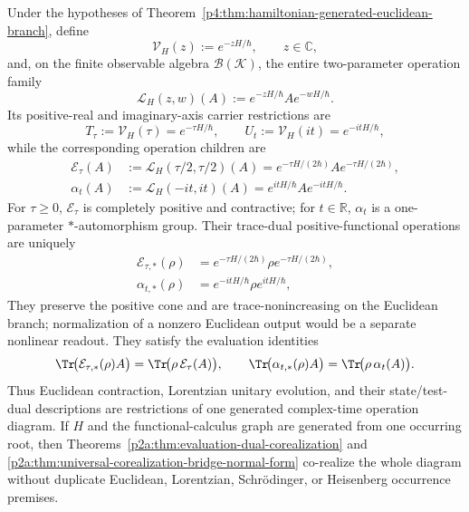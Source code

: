 \documentclass[12pt,a4paper]{article}
\begin{document}
\begin{theorem}
\label{p4:thm:complex-time-reciprocal-dynamics-square}
Under the hypotheses of
Theorem~\ref{p4:thm:hamiltonian-generated-euclidean-branch}, define
\begin{equation}
\label{p4:eq:complex-time-carrier-parent}
 \mathcal V_H(z):=e^{-zH/\hbar},
 \qquad z\in\mathbb C,
\end{equation}
and, on the finite observable algebra \(\mathcal B(\mathcal K)\), the entire
two-parameter operation family
\begin{equation}
\label{p4:eq:complex-time-two-sided-parent}
 \mathcal L_H(z,w)(A)
 :=e^{-zH/\hbar}A e^{-wH/\hbar}.
\end{equation}
Its positive-real and imaginary-axis carrier restrictions are
\begin{equation}
\label{p4:eq:complex-time-carrier-children}
 T_\tau:=\mathcal V_H(\tau)=e^{-\tau H/\hbar},
 \qquad
 U_t:=\mathcal V_H(it)=e^{-itH/\hbar},
\end{equation}
while the corresponding operation children are
\begin{align}
\label{p4:eq:complex-time-operation-children}
 \mathcal E_\tau(A)
 &:=\mathcal L_H(\tau/2,\tau/2)(A)
   =e^{-\tau H/(2\hbar)}A e^{-\tau H/(2\hbar)},\\
 \alpha_t(A)
 &:=\mathcal L_H(-it,it)(A)
   =e^{itH/\hbar}A e^{-itH/\hbar}.
\end{align}
For \(\tau\ge0\), \(\mathcal E_\tau\) is completely positive and
contractive; for \(t\in\mathbb R\), \(\alpha_t\) is a one-parameter
\(*\)-automorphism group.  Their trace-dual positive-functional operations are uniquely
\begin{align}
\label{p4:eq:complex-time-state-children}
 \mathcal E_{\tau,*}(\rho)
 &=e^{-\tau H/(2\hbar)}\rho e^{-\tau H/(2\hbar)},\\
 \alpha_{t,*}(\rho)
 &=e^{-itH/\hbar}\rho e^{itH/\hbar},
\end{align}
They preserve the positive cone and are trace-nonincreasing on the Euclidean
branch; normalization of a nonzero Euclidean output would be a separate
nonlinear readout.  They satisfy the evaluation identities
\begin{equation}
\label{p4:eq:complex-time-evaluation-square}
 \Tr\!\bigl(\mathcal E_{\tau,*}(\rho)A\bigr)
 =\Tr\!\bigl(\rho\,\mathcal E_\tau(A)\bigr),
 \qquad
 \Tr\!\bigl(\alpha_{t,*}(\rho)A\bigr)
 =\Tr\!\bigl(\rho\,\alpha_t(A)\bigr).
\end{equation}
Thus Euclidean contraction, Lorentzian unitary evolution, and their
state/test-dual descriptions are restrictions of one generated complex-time
operation diagram.  If \(H\) and the functional-calculus graph are generated
from one occurring root, then
Theorems~\ref{p2a:thm:evaluation-dual-corealization} and
\ref{p2a:thm:universal-corealization-bridge-normal-form} co-realize the whole
diagram without duplicate Euclidean, Lorentzian, Schr\"odinger, or Heisenberg
occurrence premises.


\end{theorem}
\end{document}
